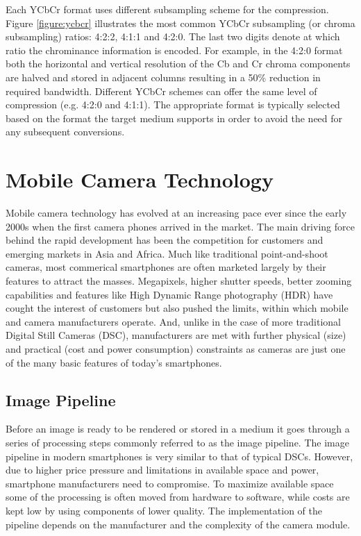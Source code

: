 \documentclass[thesis.tex]{subfiles}
\begin{document}
Each YCbCr format uses different subsampling scheme for the compression. Figure \ref{figure:ycbcr} illustrates the most common YCbCr subsampling (or chroma subsampling) ratios: 4:2:2, 4:1:1 and 4:2:0. The last two digits denote at which ratio the chrominance information is encoded. For example, in the 4:2:0 format both the horizontal and vertical resolution of the Cb and Cr chroma components are halved and stored in adjacent columns resulting in a 50\% reduction in required bandwidth. Different YCbCr schemes can offer the same level of compression (e.g. 4:2:0 and 4:1:1). The appropriate format is typically selected based on the format the target medium supports in order to avoid the need for any subsequent conversions.

\section{Mobile Camera Technology}
\label{section:mobile_camera_technology}
Mobile camera technology has evolved at an increasing pace ever since the early 2000s when the first camera phones arrived in the market. The main driving force behind the rapid development has been the competition for customers and emerging markets in Asia and Africa. Much like traditional point-and-shoot cameras, most commerical smartphones are often marketed largely by their features to attract the masses. Megapixels, higher shutter speeds, better zooming capabilities and features like High Dynamic Range photography (HDR) have cought the interest of customers but also pushed the limits, within which mobile and camera manufacturers operate. And, unlike in the case of more traditional Digital Still Cameras (DSC), manufacturers are met with further physical (size) and practical (cost and power consumption) constraints as cameras are just one of the many basic features of today's smartphones.

\subsection{Image Pipeline}
Before an image is ready to be rendered or stored in a medium it goes through a series of processing steps commonly referred to as the image pipeline. The image pipeline in modern smartphones is very similar to that of typical DSCs. However, due to higher price pressure and limitations in available space and power, smartphone manufacturers need to compromise. To maximize available space some of the processing is often moved from hardware to software, while costs are kept low by using components of lower quality. The implementation of the pipeline depends on the manufacturer and the complexity of the camera module.
\end{document}
